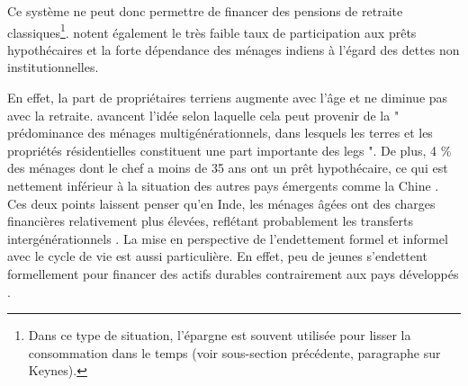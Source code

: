 \documentclass[a4paper, 11pt, onecolumn]{article}
\begin{document}
 Ce système ne peut donc permettre de financer des pensions de retraite classiques\footnote{Dans ce type de situation, l'épargne est souvent utilisée pour lisser la consommation dans le temps (voir sous-section précédente, paragraphe sur Keynes).}.
 \cite{Badarinza2016b} notent également le très faible taux de participation aux prêts hypothécaires et la forte dépendance des ménages indiens à l'égard des dettes non institutionnelles.
  \cite{Roesch2008}

 En effet, la part de propriétaires terriens augmente avec l'âge et ne diminue pas avec la retraite. 
 \cite{Badarinza2016b} avancent l'idée selon laquelle cela peut provenir de la " prédominance des ménages multigénérationnels, dans lesquels les terres et les propriétés résidentielles constituent une part importante des legs ". 
 De plus, 4 \% des ménages dont le chef a moins de 35 ans ont un prêt hypothécaire, ce qui est nettement inférieur à la situation des autres pays émergents comme la Chine \citep{Badarinza2016b}. 
 Ces deux points laissent penser qu'en Inde, les ménages âgées ont des charges financières relativement plus élevées, reflétant probablement les transferts intergénérationnels \citep{Badarinza2016b}. 
 La mise en perspective de l'endettement formel et informel avec le cycle de vie est aussi particulière.
 En effet, peu de jeunes s'endettent formellement pour financer des actifs durables contrairement aux pays développés \citep{Badarinza2016b}.
\end{document}

